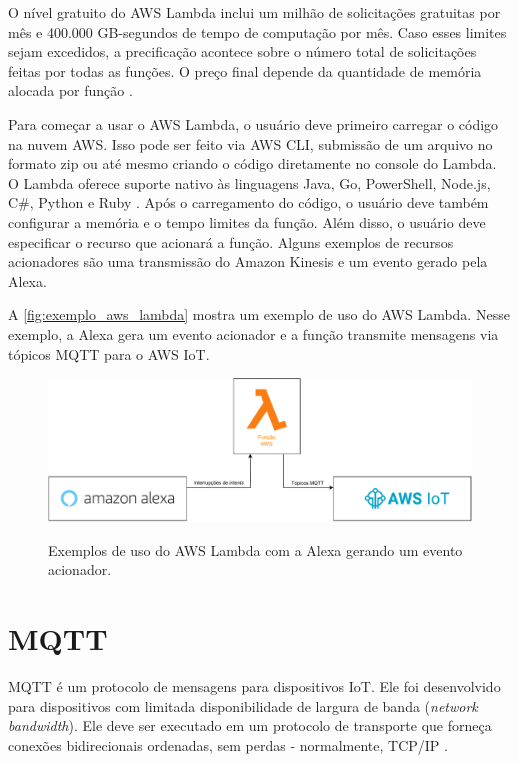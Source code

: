 O nível gratuito do AWS Lambda inclui um milhão de solicitações gratuitas por mês e 400.000 GB-segundos de tempo de computação por mês. Caso esses limites sejam excedidos, a precificação acontece sobre o número total de solicitações feitas por todas as funções. O preço final depende da quantidade de memória alocada por função \cite{ref:023}.

Para começar a usar o AWS Lambda, o usuário deve primeiro carregar o código na nuvem AWS. Isso pode ser feito via AWS CLI, submissão de um arquivo no formato zip ou até mesmo criando o código diretamente no console do Lambda.  O Lambda oferece suporte nativo às linguagens Java, Go, PowerShell, Node.js, C\#, Python e Ruby \cite{ref:024}. Após o carregamento do código, o usuário deve também configurar a memória e o tempo limites da função. Além disso, o usuário deve especificar o recurso que acionará a função. Alguns exemplos de recursos acionadores são uma transmissão do Amazon Kinesis e um evento gerado pela Alexa.

A \autoref{fig:exemplo_aws_lambda} mostra um exemplo de uso do AWS Lambda. Nesse exemplo, a Alexa gera um evento acionador e a função transmite mensagens via tópicos MQTT para o AWS IoT.

\begin{figure}[htbp]
    \centering
    \caption{Exemplos de uso do AWS Lambda com a Alexa gerando um evento acionador.}
    \includegraphics[scale=0.6]{Imagens/exemplo_aws_lambda.pdf}
    \label{fig:exemplo_aws_lambda}
\end{figure}

\section{MQTT}\label{section:mqtt}

MQTT é um protocolo de mensagens para dispositivos IoT. Ele foi desenvolvido para dispositivos com limitada disponibilidade de largura de banda (\textit{network bandwidth}). Ele deve ser executado em um protocolo de transporte que forneça conexões bidirecionais ordenadas, sem perdas - normalmente, TCP/IP \cite{ref:025}.

